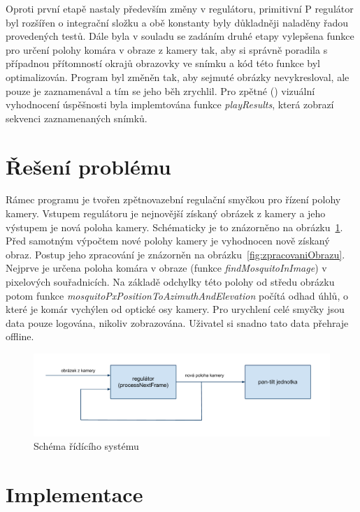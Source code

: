 \documentclass[a4paper,10pt]{article}
\begin{document}
		Oproti první etapě nastaly především změny v regulátoru, primitivní P regulátor
		byl rozšířen o integrační složku a obě konstanty byly důkladněji naladěny řadou
		provedených testů. Dále byla v souladu se zadáním druhé etapy vylepšena funkce
		pro určení polohy komára v obraze z kamery tak, aby si správně poradila s případnou
		přítomností okrajů obrazovky ve snímku a kód této funkce byl optimalizován.
		Program byl změněn tak, aby sejmuté obrázky nevykresloval,
		ale pouze je zaznamenával a tím se jeho běh zrychlil. Pro zpětné () vizuální 
		vyhodnocení úspěšnosti  byla implemtována funkce \textit{playResults},
		která zobrazí sekvenci zaznamenaných snímků.


\section{Řešení problému}

		Rámec programu je tvořen zpětnovazební regulační smyčkou pro řízení polohy
		kamery. Vstupem regulátoru je nejnovější získaný obrázek z kamery a jeho
		výstupem je nová poloha kamery. Schématicky je to znázorněno na
		obrázku~\ref{fig:ridiciSystem}.  Před samotným výpočtem nové polohy kamery
		je vyhodnocen nově získaný obraz. Postup jeho zpracování je znázorněn na
		obrázku~\ref{fig:zpracovaniObrazu}.  Nejprve je určena poloha komára v obraze
		(funkce \textit{findMosquitoInImage}) v pixelových souřadnicích. Na základě odchylky
		této polohy od středu obrázku potom funkce
		\textit{mosquitoPxPositionToAzimuthAndElevation} počítá odhad úhlů, o které je
		komár vychýlen od optické osy kamery. Pro urychlení celé smyčky jsou data pouze
		logována, nikoliv zobrazována. Uživatel si snadno tato data přehraje offline.

		\begin{figure}[!h]
			\centering
			 \includegraphics[width=1\columnwidth]{pics/schema_ridiciho_systemu}
			 \caption{Schéma řídícího systému}\label{fig:ridiciSystem}
		\end{figure}


\section{Implementace}
\end{document}
